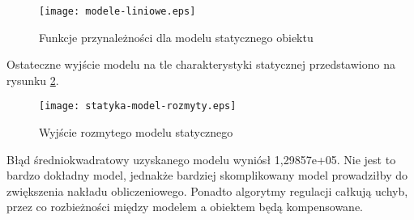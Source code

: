 \begin{figure}[!h]
	\centering \texttt{[image: modele-liniowe.eps]}
	\caption{Funkcje przynależności dla modelu statycznego obiektu}
	\label{fig:modele-liniowe}
\end{figure}
Ostateczne wyjście modelu na tle charakterystyki statycznej przedstawiono na rysunku \ref{fig:statyka-model-rozmyty}.
\begin{figure}[!h]
	\centering \texttt{[image: statyka-model-rozmyty.eps]}
	\caption{Wyjście rozmytego modelu statycznego}
	\label{fig:statyka-model-rozmyty}
\end{figure}
Błąd średniokwadratowy uzyskanego modelu wyniósł 1,29857e+05. Nie jest to bardzo dokładny model, jednakże bardziej skomplikowany model prowadziłby do zwiększenia nakładu obliczeniowego. Ponadto algorytmy regulacji całkują uchyb, przez co rozbieżności między modelem a obiektem będą kompensowane.